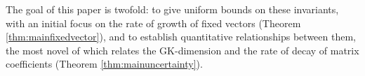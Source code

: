 \documentclass{amsart}
\newcommand{\GL}{\mathrm{GL}}
\newcommand{\1}{\m 1}
\theoremstyle{remark}
\theoremstyle{definition}
\numberwithin{equation}{subsection}
\begin{document}
The goal of this paper is twofold: to give uniform bounds on these invariants, with an initial focus on the rate of growth of fixed vectors (Theorem \ref{thm:mainfixedvector}), and to establish quantitative relationships between them, the most novel of which relates the GK-dimension and the rate of decay of matrix coefficients (Theorem \ref{thm:mainuncertainty}). %





\end{document}
